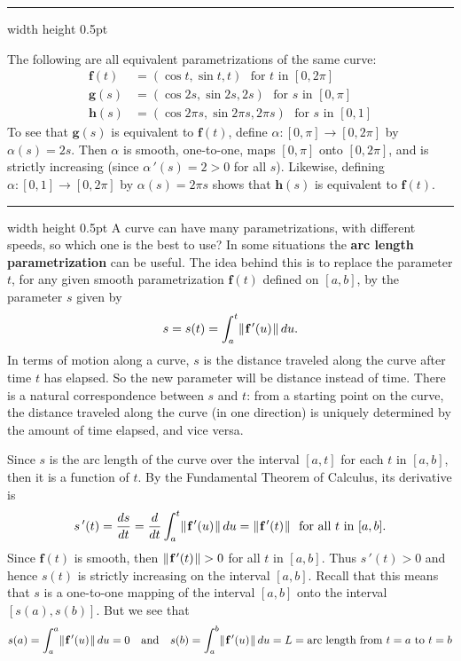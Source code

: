 \vspace{2mm}
\hrule width \textwidth height 0.5pt
\begin{exmp}\label{exmp:paramhelix}
 The following are all equivalent parametrizations of the same curve:
 \begin{align*}
  \textbf{f}(t) &= (\cos t , \sin t , t) \text{~~for $t$ in~$[0,2\pi]$}\\
  \textbf{g}(s) &= (\cos 2s , \sin 2s , 2s) \text{~~for $s$ in~$[0,\pi]$}\\
  \textbf{h}(s) &= (\cos 2\pi s , \sin 2\pi s , 2\pi s) \text{~~for $s$ in~$[0,1]$}
 \end{align*}
 To see that $\textbf{g}(s)$ is equivalent to $\textbf{f}(t)$, define $\alpha:[0,\pi] \rightarrow [0,2\pi]$ by
 $\alpha(s) = 2s$. Then $\alpha$ is smooth, one-to-one, maps $[0,\pi]$ onto $[0,2\pi]$, and is strictly increasing
 (since $\alpha\,'(s) = 2 > 0$ for all $s$). Likewise, defining $\alpha:[0,1] \rightarrow [0,2\pi]$ by
 $\alpha(s) = 2\pi s$ shows that $\textbf{h}(s)$ is equivalent to $\textbf{f}(t)$.
\end{exmp}
\hrule width \textwidth height 0.5pt
\newpage
A curve can have many parametrizations, with different speeds, so which one is the best to use? In some situations
the \textbf{arc length parametrization} can be useful. The idea behind this is to replace the parameter $t$, for any
given smooth parametrization $\textbf{f}(t)$ defined on $[a,b]$, by the parameter $s$ given by
\begin{equation}\label{eqn:arclenfcn}
 s = s(t) = \int_{a}^{t} \lVert\mspace{1mu}\textbf{f}\,'(u)\mspace{1mu}\rVert\,du .
\end{equation}
In terms of motion along a curve, $s$ is the distance traveled along the curve after time $t$ has elapsed.
So the new parameter will be distance instead of time.
There is a natural correspondence between $s$ and $t$: from a starting point on the curve, the distance
traveled along the curve (in one direction) is uniquely determined by the amount of time elapsed, and vice versa.

Since $s$ is the arc length of the curve over the interval $[a,t]$ for each $t$ in $[a,b]$, then it is a function
of $t$. By the Fundamental Theorem of Calculus, its derivative is
\begin{displaymath}
 s\,'(t) = \dfrac{ds}{dt} = \dfrac{d}{dt} \int_{a}^{t} \lVert\mspace{1mu}\textbf{f}\,'(u)\mspace{1mu}\rVert\,du =
 \lVert\mspace{1mu}\textbf{f}\,'(t)\mspace{1mu}\rVert \text{~~for all $t$ in $[a,b]$}.
\end{displaymath}
Since $\textbf{f}(t)$ is smooth, then $\lVert\mspace{1mu}\textbf{f}\,'(t)\mspace{1mu}\rVert > 0$ for all $t$ in $[a,b]$. Thus $s\,'(t) > 0$
and hence $s(t)$ is strictly increasing on the interval $[a,b]$. Recall that this means that $s$ is a one-to-one mapping
of the interval $[a,b]$ onto the interval $[s(a),s(b)]$. But we see that
\begin{displaymath}
 s(a) = \int_{a}^{a} \lVert\mspace{1mu}\textbf{f}\,'(u)\mspace{1mu}\rVert\,du = 0 \quad \text{and} \quad
 s(b) = \int_{a}^{b} \lVert\mspace{1mu}\textbf{f}\,'(u)\mspace{1mu}\rVert\,du = L = \text{arc length from $t = a$ to $t = b$}
\end{displaymath}

